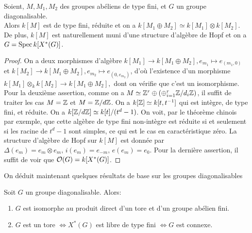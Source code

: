 \begin{prop}
Soient, $M, M_1, M_2$ des groupes abéliens de type fini, et $G$ un groupe diagonalisable.\\
Alors $k[M]$ est de type fini, réduite et on a $k[M_1\oplus M_2]\simeq k[M_1]\otimes k[M_2]$. De plus, $k[M]$ est naturellement muni d'une structure d'algèbre de Hopf et on a $G=\operatorname{Spec} k[X^*(G)]$.
\end{prop}
\begin{proof}
On a deux morphismes d'algèbre $k[M_1]\rightarrow k[M_1\oplus M_2], e_{m_1}\mapsto e_{(m_1,0)}$ et $k[M_2]\rightarrow k[M_1\oplus M_2], e_{m_2}\mapsto e_{(0,e_{m_2})}$, d'où l'existence d'un morphisme $k[M_1]\otimes_k k[M_2]\rightarrow k[M_1\oplus M_2], $ dont on vérifie que c'est un isomorphisme.
Pour la deuxième assertion, comme on a $M\simeq \mathbb{Z}^r\oplus (\oplus_{i=1}^r \mathbb{Z}/d_i\mathbb{Z})$, il suffit de traiter les cas $M=\mathbb{Z}$ et $M=\mathbb{Z}/d\mathbb{Z}$. On a $k[\mathbb{Z}]\simeq k[t,t^{-1}]$ qui est intègre, de type fini, et réduite. On a $k[\mathbb{Z}/d\mathbb{Z}]\simeq k[t]/(t^d-1)$. On voit, par le théorème chinois par exemple, que cette algèbre de type fini non-intègre est réduite si et seulement si les racine de $t^d-1$ sont simples, ce qui est le cas en caractéristique zéro. La structure d'algèbre de Hopf sur $k[M]$ est donnée par $\Delta(e_m)=e_m\otimes e_m,\, i(e_m)=e_{-m},\, e(e_m)=e_0$. Pour la dernière assertion, il suffit de voir que $\mathcal{O}(G)=k[X^*(G)]$.
\end{proof}

On déduit maintenant quelques résultats de base sur les groupes diagonalisables

\begin{prop}
Soit $G$ un groupe diagonalisable. Alors:
\begin{enumerate}
\item $G$ est isomorphe au produit direct d'un tore et d'un groupe abélien fini.
\item $G$ est un tore $\iff X^*(G)$ est libre de type fini $\iff G$ est connexe.
\end{enumerate}
\end{prop}

